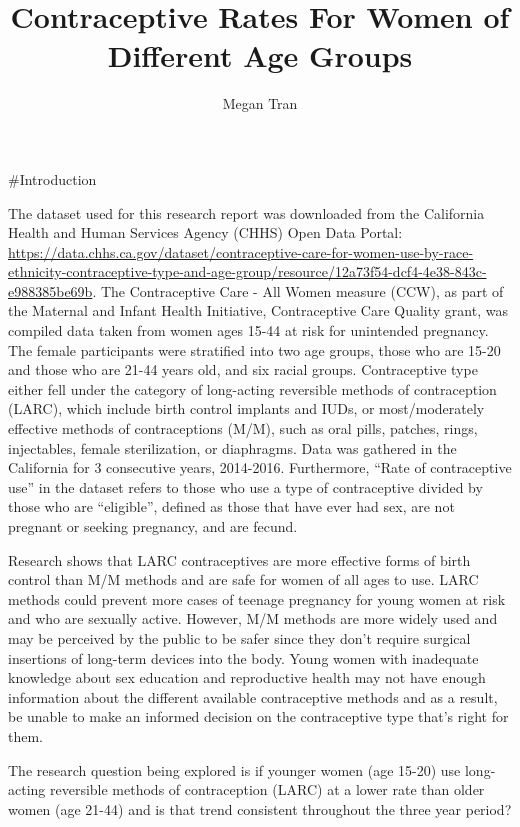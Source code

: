 \documentclass[
]{article}
\title{Contraceptive Rates For Women of Different Age Groups}
\author{Megan Tran}
\date{}
\begin{document}
\maketitle

\#Introduction

The dataset used for this research report was downloaded from the
California Health and Human Services Agency (CHHS) Open Data Portal:
\url{https://data.chhs.ca.gov/dataset/contraceptive-care-for-women-use-by-race-ethnicity-contraceptive-type-and-age-group/resource/12a73f54-dcf4-4e38-843c-e988385be69b}.
The Contraceptive Care - All Women measure (CCW), as part of the
Maternal and Infant Health Initiative, Contraceptive Care Quality grant,
was compiled data taken from women ages 15-44 at risk for unintended
pregnancy. The female participants were stratified into two age groups,
those who are 15-20 and those who are 21-44 years old, and six racial
groups. Contraceptive type either fell under the category of long-acting
reversible methods of contraception (LARC), which include birth control
implants and IUDs, or most/moderately effective methods of
contraceptions (M/M), such as oral pills, patches, rings, injectables,
female sterilization, or diaphragms. Data was gathered in the California
for 3 consecutive years, 2014-2016. Furthermore, ``Rate of contraceptive
use'' in the dataset refers to those who use a type of contraceptive
divided by those who are ``eligible'', defined as those that have ever
had sex, are not pregnant or seeking pregnancy, and are fecund.

Research shows that LARC contraceptives are more effective forms of
birth control than M/M methods and are safe for women of all ages to
use. LARC methods could prevent more cases of teenage pregnancy for
young women at risk and who are sexually active. However, M/M methods
are more widely used and may be perceived by the public to be safer
since they don't require surgical insertions of long-term devices into
the body. Young women with inadequate knowledge about sex education and
reproductive health may not have enough information about the different
available contraceptive methods and as a result, be unable to make an
informed decision on the contraceptive type that's right for them.

The research question being explored is if younger women (age 15-20) use
long-acting reversible methods of contraception (LARC) at a lower rate
than older women (age 21-44) and is that trend consistent throughout the
three year period?
\end{document}
